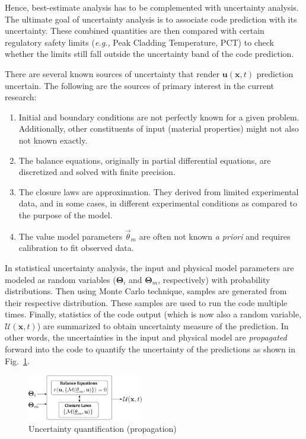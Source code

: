 \documentclass[11pt,titlepage]{article}
\begin{document}
Hence, best-estimate analysis has to be complemented with uncertainty analysis.
The ultimate goal of uncertainty analysis is to associate code prediction with its uncertainty. 
These combined quantities are then compared with certain regulatory safety limits (\textit{e.g.,} Peak Cladding Temperature, PCT) to check whether the limits still fall outside the uncertainty band of the code prediction.

There are several known sources of uncertainty that render $\mathbf{u}(\mathbf{x}, t)$ prediction uncertain.
The following are the sources of primary interest in the current research:
\begin{enumerate}
	\item Initial and boundary conditions are not perfectly known for a given problem. Additionally, other constituents of input (material properties) might not also not known exactly.
	\item The balance equations, originally in partial differential equations, are discretized and solved with finite precision.
	\item The closure laws are approximation. They derived from limited experimental data, and in some cases, in different experimental conditions as compared to the purpose of the model.
	\item The value model parameters $\vec{\theta}_m$ are often not known \emph{a priori} and requires calibration to fit observed data.
\end{enumerate}

In statistical uncertainty analysis, the input and physical model parameters are modeled as random variables ($\mathbf{\Theta}_i$ and $\mathbf{\Theta}_m$, respectively) with probability distributions. 
Then using Monte Carlo technique, samples are generated from their respective distribution.
These samples are used to run the code multiple times. 
Finally, statistics of the code output (which is now also a random variable, $\mathbf{\mathcal{U}}(\mathbf{x},t)$) are summarized to obtain uncertainty measure of the prediction. 
In other words, the uncertainties in the input and physical model are \emph{propagated} forward into the code to quantify the uncertainty of the predictions as shown in Fig.~\ref{fig:forwardUQ}.
\begin{figure}[htbp]
	\centering
	\includegraphics[width=0.45\textwidth]{forwardUQ.pdf}
	\caption{Uncertainty quantification (propagation)}
	\label{fig:forwardUQ}
\end{figure}
\end{document}
